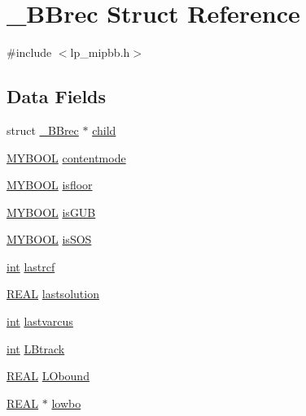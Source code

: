 \hypertarget{struct___b_brec}{}\section{\+\_\+\+B\+Brec Struct Reference}
\label{struct___b_brec}


{\ttfamily \#include $<$lp\+\_\+mipbb.\+h$>$}

\subsection*{Data Fields}
\begin{DoxyCompactItemize}
\item 
struct \hyperlink{struct___b_brec}{\+\_\+\+B\+Brec} $\ast$ \hyperlink{struct___b_brec_aa84a5c8c1041014c67ae7a62e3f4d8ff}{child}
\item 
\hyperlink{lp__lib_8h_aad848328fb3018217ac9f01d97b6bd88}{M\+Y\+B\+O\+OL} \hyperlink{struct___b_brec_aea3755209f389ff77e9500f61b366837}{contentmode}
\item 
\hyperlink{lp__lib_8h_aad848328fb3018217ac9f01d97b6bd88}{M\+Y\+B\+O\+OL} \hyperlink{struct___b_brec_ab13234add76408b9c48796a7f682ecba}{isfloor}
\item 
\hyperlink{lp__lib_8h_aad848328fb3018217ac9f01d97b6bd88}{M\+Y\+B\+O\+OL} \hyperlink{struct___b_brec_a5b7c7121d8f41ac455f3a073eadf3de9}{is\+G\+UB}
\item 
\hyperlink{lp__lib_8h_aad848328fb3018217ac9f01d97b6bd88}{M\+Y\+B\+O\+OL} \hyperlink{struct___b_brec_aabb46bbef7875d78a36a3c7126894716}{is\+S\+OS}
\item 
\hyperlink{lp__lib_8h_adeb9ec6400320e4923ac9d836d509ddb}{int} \hyperlink{struct___b_brec_a625cd7a5d05a4e31693ce3f0e7c39b10}{lastrcf}
\item 
\hyperlink{lp__lib_8h_a92bd5e363d131fa73669358edb232dce}{R\+E\+AL} \hyperlink{struct___b_brec_a285fe2c23494addd3f206f07e798ae0e}{lastsolution}
\item 
\hyperlink{lp__lib_8h_adeb9ec6400320e4923ac9d836d509ddb}{int} \hyperlink{struct___b_brec_aedd99607152ba3b58509c67d61aee479}{lastvarcus}
\item 
\hyperlink{lp__lib_8h_adeb9ec6400320e4923ac9d836d509ddb}{int} \hyperlink{struct___b_brec_a1cd1a758f639030bd7a330ad27db44f9}{L\+Btrack}
\item 
\hyperlink{lp__lib_8h_a92bd5e363d131fa73669358edb232dce}{R\+E\+AL} \hyperlink{struct___b_brec_ae4306fe90c375fff028fddf497a7a07b}{L\+Obound}
\item 
\hyperlink{lp__lib_8h_a92bd5e363d131fa73669358edb232dce}{R\+E\+AL} $\ast$ \hyperlink{struct___b_brec_aa22f3626220e6ed51811b81d286d9ad0}{lowbo}

\end{DoxyCompactItemize}
